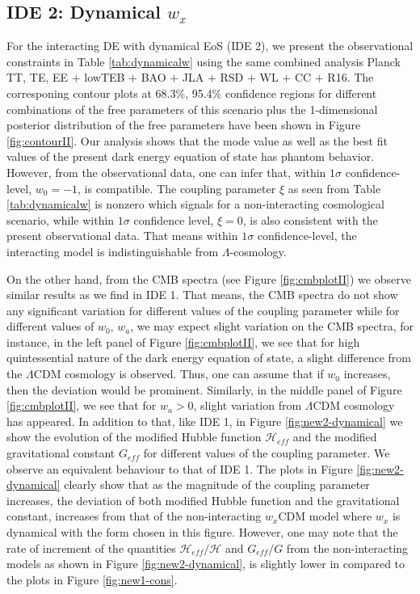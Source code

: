 \documentclass[superscriptaddress,oneolumn,secnumarabic,
amssymb,amsmath,nobibnotes,aps,prd,showpacs,nofootinbib]{revtex4}%
\begin{document}
\subsection{IDE 2: Dynamical $w_x$}
\label{sec-dynamical}

For the interacting DE with dynamical EoS (IDE 2), we present the observational constraints in Table \ref{tab:dynamicalw} using the same combined analysis  Planck TT, TE, EE $+$ lowTEB $+$ BAO $+$ JLA $+$ RSD $+$ WL $+$ CC $+$ R16. The corresponing contour plots at 68.3\%, 95.4\% confidence regions for different combinations of the free parameters of this scenario plus the 1-dimensional posterior distribution of the free parameters have been shown in Figure \ref{fig:contourII}. Our analysis shows that the mode value as well as the best fit values of the present dark energy equation of state has phantom behavior. However, from the observational data, one can infer that, within $1\sigma$ confidence-level, $w_0 = -1$, is compatible. The coupling parameter $\xi$  as seen from Table \ref{tab:dynamicalw} is nonzero which signals for a non-interacting cosmological scenario, while within $1\sigma$ confidence level, $\xi = 0$, is also consistent with the present observational data. That means within $1\sigma$ confidence-level, the interacting model is indistinguishable from $\Lambda$-cosmology.


On the other hand, from the CMB spectra (see Figure \ref{fig:cmbplotII}) we observe similar results as we find in IDE 1. That means, the CMB spectra do not show any significant variation for different values of the coupling parameter while for different values of $w_0$, $w_a$, we may expect slight variation on the CMB spectra, for instance, in the left panel of Figure \ref{fig:cmbplotII}, we see that for high quintessential nature of the dark energy equation of state, a slight difference from the $\Lambda$CDM cosmology is observed. Thus, one can assume that if $w_0$ increases, then the deviation would be prominent. Similarly, in the middle panel of Figure \ref{fig:cmbplotII}, we see that for $w_a > 0$, slight variation from $\Lambda$CDM cosmology has appeared. In addition to that, like IDE 1, in Figure \ref{fig:new2-dynamical} we show the evolution of the modified Hubble function $\mathcal{H}_{eff}$ and the modified gravitational constant $G_{eff}$ for different values of the coupling parameter. We observe an equivalent behaviour to that of IDE 1. The plots in Figure \ref{fig:new2-dynamical} clearly  show that as the magnitude of the coupling parameter increases, the deviation of both modified Hubble function and the gravitational constant, increases from that of the non-interacting $w_x$CDM model where $w_x$ is dynamical with the form chosen in this figure. However, one may note that the rate of increment of the quantities $\mathcal{H}_{eff}/\mathcal{H}$ and $G_{eff}/G$ from the non-interacting models as shown in Figure \ref{fig:new2-dynamical}, is slightly lower in compared to the plots in Figure \ref{fig:new1-cons}.
\end{document}
